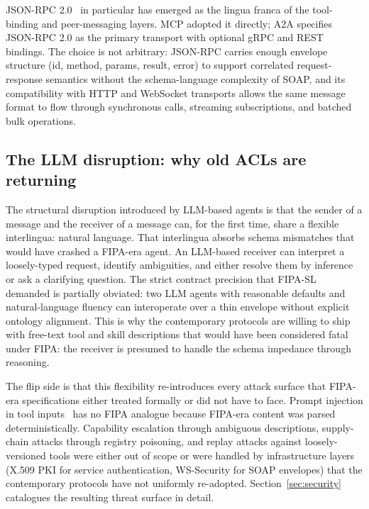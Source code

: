 JSON-RPC 2.0~\cite{spec_jsonrpc} in particular has emerged as
the lingua franca of the tool-binding and peer-messaging
layers. MCP adopted it
directly; A2A specifies JSON-RPC 2.0 as the primary transport
with optional gRPC and REST bindings. The choice is not
arbitrary: JSON-RPC carries enough envelope structure (id,
method, params, result, error) to support correlated
request-response semantics without the schema-language
complexity of SOAP, and its compatibility with HTTP and
WebSocket transports allows the same message format to flow
through synchronous calls, streaming subscriptions, and
batched bulk operations.

\subsection{The LLM disruption: why old ACLs are returning}
\label{sec:background:llm-disruption}

The structural disruption introduced by LLM-based agents is
that the sender of a message and the receiver of a message can,
for the first time, share a flexible interlingua: natural
language. That interlingua absorbs schema mismatches that would have
crashed a FIPA-era agent. An LLM-based receiver can interpret a
loosely-typed request, identify ambiguities, and either resolve
them by inference or ask a clarifying question. The strict
contract precision that FIPA-SL demanded is partially obviated:
two LLM agents with reasonable defaults and natural-language
fluency can interoperate over a thin envelope without explicit
ontology alignment. This is why the contemporary protocols are
willing to ship with free-text tool and skill descriptions
that would have been considered fatal under FIPA: the receiver
is presumed to handle the schema impedance through reasoning.

The flip side is that this flexibility re-introduces every
attack surface that FIPA-era specifications either treated
formally or did not have to face. Prompt injection in tool
inputs~\cite{zhan2024injecagent} has no FIPA analogue because
FIPA-era content was parsed deterministically. Capability
escalation through ambiguous descriptions, supply-chain attacks
through registry poisoning, and replay attacks against
loosely-versioned tools were either out of scope or were
handled by infrastructure layers (X.509 PKI for service
authentication, WS-Security for SOAP envelopes) that the
contemporary protocols have not uniformly re-adopted.
Section~\ref{sec:security} catalogues the resulting threat
surface in detail.

